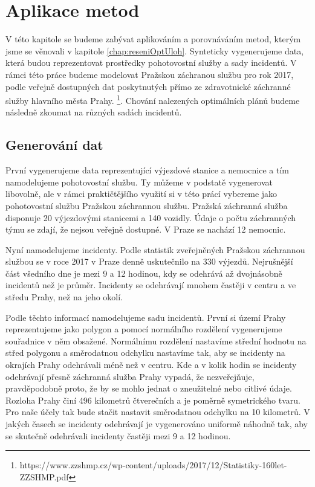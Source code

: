 \chapter{Aplikace metod}

V této kapitole se budeme zabývat aplikováním a porovnáváním metod, kterým jsme se věnovali v kapitole \ref{chap:reseniOptUloh}.
Synteticky vygenerujeme data, která budou reprezentovat prostředky pohotovostní služby a sady incidentů. 
V rámci této práce budeme modelovat Pražskou záchranou službu pro rok 2017, podle veřejně dostupných dat
poskytnutých přímo ze zdravotnické záchranné služby hlavního města Prahy.
\footnote{https://www.zzshmp.cz/wp-content/uploads/2017/12/Statistiky-160let-ZZSHMP.pdf}.
Chování nalezených optimálních plánů budeme následně zkoumat na různých sadách incidentů.

\section{Generování dat}

První vygenerujeme data reprezentující výjezdové stanice a nemocnice a tím namodelujeme pohotovostní službu.
Ty můžeme v podstatě vygenerovat libovolně, ale v rámci praktičtějšího využití
si v této prácí vybereme jako pohotovostní službu Pražskou záchrannou službu.
Pražská záchranná služba disponuje 20 výjezdovými stanicemi a 140 vozidly.
Údaje o počtu záchranných týmu se zdají, že nejsou veřejně dostupné.
V Praze se nachází 12 nemocnic.

Nyní namodelujeme incidenty. Podle statistik zveřejněných Pražskou záchrannou službou se v roce 2017 v Praze denně uskutečnilo na 330 výjezdů.
Nejrušnější část všedního dne je mezi 9 a 12 hodinou, kdy se odehrává až dvojnásobně incidentů než je průměr.
Incidenty se odehrávají mnohem častěji v centru a ve středu Prahy, než na jeho okolí. 

Podle těchto informací namodelujeme sadu incidentů.
První si území Prahy reprezentujeme jako polygon a pomocí normálního rozdělení vygenerujeme souřadnice v něm obsažené.
Normálnímu rozdělení nastavíme střední hodnotu na střed polygonu a směrodatnou odchylku nastavíme tak, aby se incidenty na okrajích Prahy odehrávali méně než v centru. 
Kde a v kolik hodin se incidenty odehrávají přesně záchranná služba Prahy vypadá, že nezveřejňuje, pravděpodobně proto, že by se mohlo jednat o zneužitelné nebo citlivé údaje.
Rozloha Prahy činí 496 kilometrů čtverečních a je poměrně symetrického tvaru. Pro naše účely tak bude stačit nastavit směrodatnou odchylku na 10 kilometrů.
V jakých časech se incidenty odehrávají je vygenerováno uniformě náhodně tak, aby se skutečně odehrávali incidenty častěji mezi 9 a 12 hodinou.

